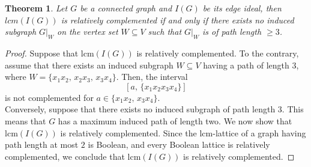 \documentclass[11pt]{amsart}
\newcommand{\lcm}{\mathrm{lcm}}
\newcommand{\supp}{\mathrm{supp}}
\theoremstyle{plain}
\numberwithin{lemma}{\DefaultNumberTheoremWithin}
\numberwithin{claim}{\DefaultNumberTheoremWithin}
\newtheorem{theorem}{Theorem}
\numberwithin{theorem}{\DefaultNumberTheoremWithin}
\numberwithin{corollary}{\DefaultNumberTheoremWithin}
\numberwithin{proposition}{\DefaultNumberTheoremWithin}
\numberwithin{conjecture}{\DefaultNumberTheoremWithin}
\theoremstyle{definition}
\numberwithin{definition}{\DefaultNumberTheoremWithin}
\theoremstyle{definition}
\numberwithin{question}{\DefaultNumberTheoremWithin}
\theoremstyle{definition}
\numberwithin{problem}{\DefaultNumberTheoremWithin}
\theoremstyle{remark}
\numberwithin{remark}
     {\DefaultNumberTheoremWithin}
\theoremstyle{remark}
\numberwithin{example}{\DefaultNumberTheoremWithin}
\begin{document}
\begin{theorem}
     Let $G$ be a connected graph and $I(G)$ be its edge ideal, then $lcm(I(G))$ is \emph{relatively complemented} if and only if there exists no induced subgraph $G|_W$ on the vertex set $W \subseteq V$ such that ${G|_W}$ is of path length $ \geq 3$.
\end{theorem}
\begin{proof}
%
%
%
%

%
     Suppose that $\lcm(I(G))$ is relatively complemented. 
To the contrary, assume that there exists an induced subgraph $W \subseteq V$ having a path of length $3$, where 
$W = \{x_1x_2,\, x_2x_3,\, x_3x_4\}$. 
Then, the interval 
\[
[a,\, \{x_1x_2x_3x_4\}]
\]
is not complemented for $a \in \{x_1x_2,\, x_3x_4\}$. \\[4pt]
Conversely, suppose that there exists no induced subgraph of path length $3$. 
This means that $G$ has a maximum induced path of length two. 
We now show that $\lcm(I(G))$ is relatively complemented. 
Since the $\lcm$-lattice of a graph having path length at most $2$ is Boolean, and every Boolean lattice is relatively complemented, we conclude that $\lcm(I(G))$ is relatively complemented.

\end{proof}
\end{document}

